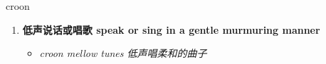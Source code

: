 
\begin{frame}
{\huge croon}
\begin{center}
\begin{enumerate}\Large
  \item \textbf{低声说话或唱歌 speak or sing in a gentle murmuring manner}
  \begin{itemize}
    \item \em{\Large{croon mellow tunes 低声唱柔和的曲子}}
  \end{itemize}
\end{enumerate}
\end{center}
\end{frame}
